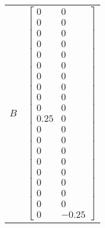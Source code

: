 \begin{tabular}{cl}
   $B$    & $\left[\begin{matrix}0 & 0\\0 & 0\\0 & 0\\0 & 0\\0 & 0\\0 & 0\\0 & 0\\0 & 0\\0 & 0\\0 & 0\\0.25 & 0\\0 & 0\\0 & 0\\0 & 0\\0 & 0\\0 & 0\\0 & 0\\0 & 0\\0 & 0\\0 & -0.25\end{matrix}\right]$                                                                                                                                                                                                                                                                                                                                                                                                                                                                                                                                                                                                                                                                                                                                                                                                                                                                                                                                                                                                                                                                                                                                                                                                                                                                                                                                                                                                                                                                                                                                                                                                                                                      \\

\end{tabular}
